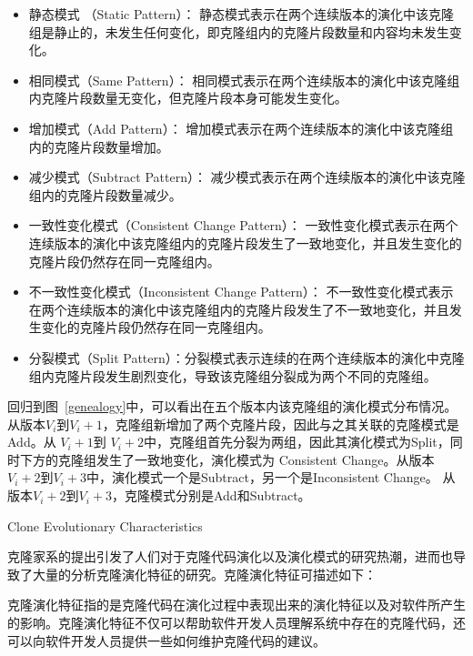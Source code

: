 \begin{itemize}
\item 
{静态模式 （Static Pattern）}：
静态模式表示在两个连续版本的演化中该克隆组是静止的，未发生任何变化，即克隆组内的克隆片段数量和内容均未发生变化。
\item 
{相同模式（Same Pattern）}：
相同模式表示在两个连续版本的演化中该克隆组内克隆片段数量无变化，但克隆片段本身可能发生变化。
\item 
{增加模式（Add Pattern）}：
增加模式表示在两个连续版本的演化中该克隆组内的克隆片段数量增加。
\item 
{减少模式（Subtract Pattern）}：
减少模式表示在两个连续版本的演化中该克隆组内的克隆片段数量减少。
\item 
{ 一致性变化模式（Consistent Change Pattern）}： 
一致性变化模式表示在两个连续版本的演化中该克隆组内的克隆片段发生了一致地变化，并且发生变化的克隆片段仍然存在同一克隆组内。
\item 
{不一致性变化模式（Inconsistent Change Pattern）}：
不一致性变化模式表示在两个连续版本的演化中该克隆组内的克隆片段发生了不一致地变化，并且发生变化的克隆片段仍然存在同一克隆组内。
\item 
{分裂模式（Split Pattern）}：分裂模式表示连续的在两个连续版本的演化中克隆组内克隆片段发生剧烈变化，导致该克隆组分裂成为两个不同的克隆组。
\end{itemize}

回归到图~\ref{genealogy}中，可以看出在五个版本内该克隆组的演化模式分布情况。从版本{$V_i$}到{$V_i+1$}，克隆组新增加了两个克隆片段，因此与之其关联的克隆模式是{Add}。从{ $V_i+1$}到{ $V_i+2$}中，克隆组首先分裂为两组，因此其演化模式为{Split}，同时下方的克隆组发生了一致地变化，演化模式为{ Consistent Change}。从版本{$V_i+2$}到{$V_i+3$}中，演化模式一个是{Subtract}，另一个是{Inconsistent Change}。 从版本{$V_i+2$}到{$V_i+3$}，克隆模式分别是{Add}和{Subtract}。

{Clone Evolutionary Characteristics}

克隆家系的提出引发了人们对于克隆代码演化以及演化模式的研究热潮，进而也导致了大量的分析克隆演化特征的研究。克隆演化特征可描述如下：

\begin{definition} [{克隆演化特征}]
\label{defn-characteristics}
{
克隆演化特征指的是克隆代码在演化过程中表现出来的演化特征以及对软件所产生的影响。克隆演化特征不仅可以帮助软件开发人员理解系统中存在的克隆代码，还可以向软件开发人员提供一些如何维护克隆代码的建议。
 }
\end {definition}


